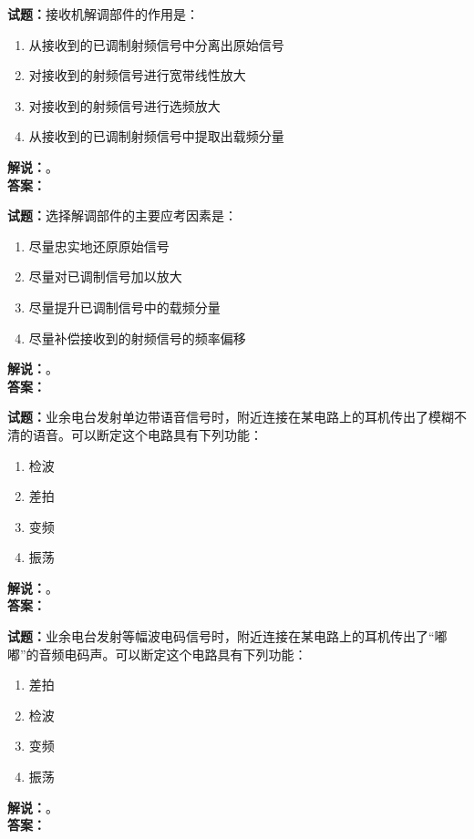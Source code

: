 \documentclass{ctexbook}
\begin{document}
\bigskip




\noindent\textbf{试题：}接收机解调部件的作用是：
\begin{enumerate}[leftmargin=3em]
\item 从接收到的已调制射频信号中分离出原始信号
\item 对接收到的射频信号进行宽带线性放大
\item 对接收到的射频信号进行选频放大
\item 从接收到的已调制射频信号中提取出载频分量
\end{enumerate}
\noindent\textbf{解说：}\textbf{}。\\\noindent\textbf{答案：}

\bigskip




\noindent\textbf{试题：}选择解调部件的主要应考因素是：
\begin{enumerate}[leftmargin=3em]
\item 尽量忠实地还原原始信号
\item 尽量对已调制信号加以放大
\item 尽量提升已调制信号中的载频分量
\item 尽量补偿接收到的射频信号的频率偏移
\end{enumerate}
\noindent\textbf{解说：}\textbf{}。\\\noindent\textbf{答案：}

\bigskip




\noindent\textbf{试题：}业余电台发射单边带语音信号时，附近连接在某电路上的耳机传出了模糊不清的语音。可以断定这个电路具有下列功能：
\begin{enumerate}[leftmargin=3em]
\item 检波
\item 差拍
\item 变频
\item 振荡
\end{enumerate}
\noindent\textbf{解说：}\textbf{}。\\\noindent\textbf{答案：}

\bigskip




\noindent\textbf{试题：}业余电台发射等幅波电码信号时，附近连接在某电路上的耳机传出了“嘟嘟”的音频电码声。可以断定这个电路具有下列功能：
\begin{enumerate}[leftmargin=3em]
\item 差拍
\item 检波
\item 变频
\item 振荡
\end{enumerate}
\noindent\textbf{解说：}\textbf{}。\\\noindent\textbf{答案：}
\end{document}
